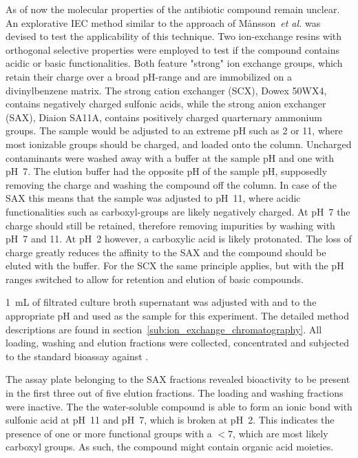 As of now the molecular properties of the antibiotic compound remain
unclear. An explorative IEC method similar to the approach of
M{\aa}nsson~\textit{et al.} was devised to test the applicability of this technique.\autocite{Mansson2010}
Two ion-exchange resins with orthogonal selective properties were employed to test if the compound contains acidic or basic functionalities.
Both feature "strong" ion exchange groups, which retain their charge over a broad pH-range and are immobilized on a divinylbenzene matrix.
The strong cation exchanger (SCX), Dowex 50WX4, contains negatively charged sulfonic acids, while the strong anion exchanger (SAX), Diaion SA11A, contains positively charged quarternary ammonium groups.
The sample would be adjusted to an extreme pH such as 2 or 11, where most ionizable groups should be charged, and loaded onto the column.
Uncharged contaminants were washed away with a buffer at the sample pH and one with pH~7.
The elution buffer had the opposite pH of the sample pH, supposedly removing the charge and washing the compound off the column.
In case of the SAX this means that the sample was adjusted to pH~11, where acidic functionalities such as carboxyl-groups are likely negatively charged.
At pH~7 the charge should still be retained, therefore removing impurities by washing with pH~7 and 11.
At pH~2 however, a carboxylic acid is likely protonated.
The loss of charge greatly reduces the affinity to the SAX and the compound should be eluted with the buffer.
For the SCX the same principle applies, but with the pH ranges switched to allow for retention and elution of basic compounds.

\SI{1}{\milli\liter} of filtrated culture broth supernatant was adjusted with  and  to the appropriate pH and used as the sample for this experiment.
The detailed method descriptions are found in section~\ref{sub:ion_exchange_chromatography}.
All loading, washing and elution fractions were collected, concentrated and subjected to the standard bioassay against \coli.

The assay plate belonging to the SAX fractions revealed bioactivity to be present in the first three out of five elution fractions.
The loading and washing fractions were inactive.
The the water-soluble compound is able to form an ionic bond with sulfonic acid at pH~11 and pH~7, which is broken at pH~2.
This indicates the presence of one or more functional groups with a \pka$<7$, which are most likely carboxyl groups.
As such, the compound might contain organic acid moieties.

